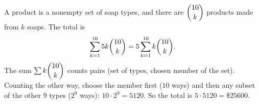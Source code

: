 A product is a nonempty set of soap types, and there are $\dbinom{10}{k}$ products made from $k$ soaps. The total is
\[\sum_{k=1}^{10}5k\dbinom{10}{k}=5\sum_{k=1}^{10}k\dbinom{10}{k}.\]
The sum $\sum k\dbinom{10}{k}$ counts pairs (set of types, chosen member of the set). Counting the other way, choose the member first ($10$ ways) and then any subset of the other $9$ types ($2^9$ ways): $10\cdot2^9=5120$. So the total is $5\cdot5120=\boxed{\$25600}$.
